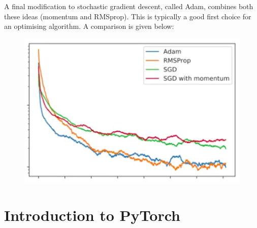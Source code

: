 A final modification to stochastic gradient descent, called Adam, combines both these ideas (momentum and RMSprop). This is typically a good first choice for an optimising algorithm. A comparison is given below:
\begin{figure}[H]
\centering
\includegraphics[scale=0.4]{sgdcomparison.png}
\end{figure}








\newpage
\section{Introduction to PyTorch}





